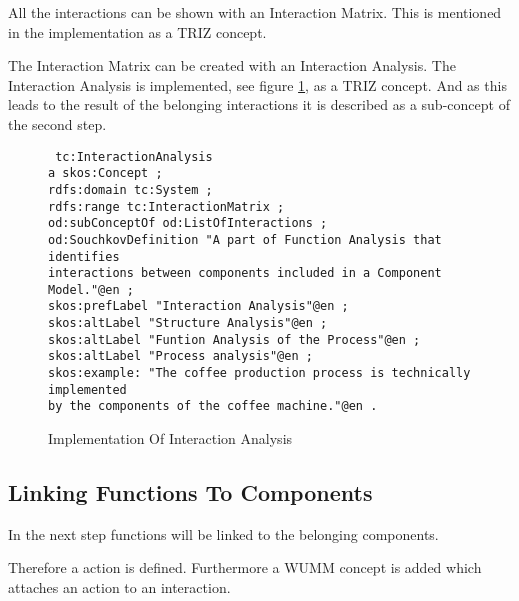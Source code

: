 All the interactions can be shown with an Interaction Matrix. 
This is mentioned in the implementation as a TRIZ concept. 

The Interaction Matrix can be created with an Interaction Analysis. 
The Interaction Analysis is implemented, see figure \ref{fig:implementation_interaction_analysis}, as a TRIZ concept.
And as this leads to the result of the belonging interactions it is described as a sub-concept of the second step.

\begin{figure}[h]
    \centering
    \begin{code}\tt
        tc:InteractionAnalysis\\
        \> a skos:Concept ;\\
        \> rdfs:domain tc:System ;\\
        \> rdfs:range tc:InteractionMatrix ;\\
        \> od:subConceptOf od:ListOfInteractions ;\\
        \> od:SouchkovDefinition "A part of Function Analysis that identifies\\
        \> \> interactions between components included in a Component Model."@en ;\\
        \> skos:prefLabel "Interaction Analysis"@en ;\\
        \> skos:altLabel "Structure Analysis"@en ;\\
        \> skos:altLabel "Funtion Analysis of the Process"@en ;\\
        \> skos:altLabel "Process analysis"@en ;\\
        \> skos:example: "The coffee production process is technically implemented\\
        \> \> by the components of the coffee machine."@en .\\
    \end{code}
    \caption{Implementation Of Interaction Analysis}
    \label{fig:implementation_interaction_analysis}
\end{figure}

\subsection{Linking Functions To Components}

In the next step functions will be linked to the belonging components. 

Therefore a action is defined. 
Furthermore a WUMM concept is added which attaches an action to an interaction.

